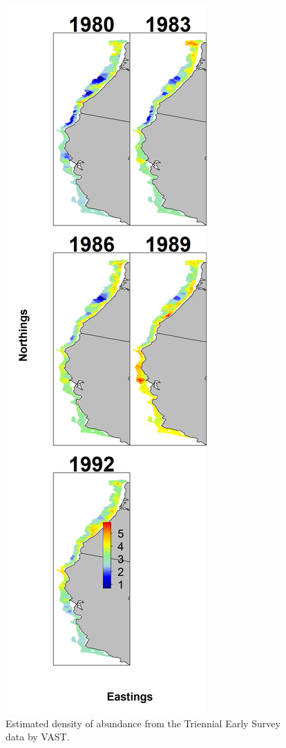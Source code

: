 \documentclass[12pt,]{article}
\begin{document}
\begin{figure}
\centering
\includegraphics{Figures/tri_early_dens.png}
\caption{Estimated density of abundance from the Triennial Early Survey
data by VAST. \label{fig:tri_early_density}}
\end{figure}
\end{document}

